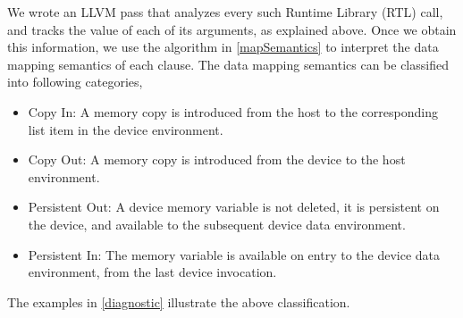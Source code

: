 We wrote an LLVM pass that analyzes every such Runtime Library (RTL) call, and tracks the 
value of each of its arguments, as explained above. Once we obtain this information, 
we use the algorithm in \autoref{mapSemantics} to interpret the data mapping semantics of each clause.
The data mapping semantics can be classified into following categories, 
\begin{itemize} \vspace{-5pt}
 \item Copy In: A memory copy is introduced from the host to the 
 corresponding list item in the device environment.
 \item Copy Out: A memory copy is introduced from the device to the host environment.
 \item Persistent Out: A device memory variable is not deleted, it is persistent on the device, 
 and available to the subsequent device data environment.
 \item Persistent In: The memory variable is available on entry to the device data environment, 
 from the last device invocation.
\end{itemize}
The examples in \autoref{diagnostic} illustrate the above classification.

